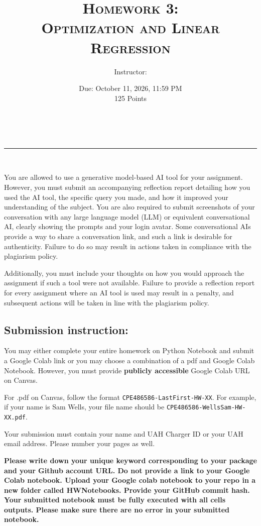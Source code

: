 \documentclass[12pt, xcolor=dvipsnames,svgnames,x11names]{article}
\makeatletter
\newcommand{\hdrrule}{{\color{hdrcoral}\rule{4.5em}{1.1pt}}}
\renewcommand{\maketitle}{%
      \begin{center}
         \begin{tcolorbox}[
               enhanced,
               colback=white,
               colframe=hdrslate,
               boxrule=0.8pt,
               arc=4pt,
               left=0pt,
               right=0pt,
               top=0pt,
               bottom=0pt,
               drop shadow={hdrslate!35!white},
         ]
               \begin{tcolorbox}[
                  enhanced,
                  colback=hdrplum,
                  colframe=hdrplum,
                  boxrule=0pt,
                  arc=4pt,
                  sharp corners=south,
                  left=2em,
                  right=2em,
                  top=1.1em,
                  bottom=1.1em,
                  borderline south={2.2pt}{0pt}{hdrcoral},
               ]
                  \centering
                  {\LARGE\color{white}\linespread{1.25}\selectfont\@title}
               \end{tcolorbox}

               \vspace{1.1em}
               \centering
               {\large\color{hdrslate}\@author}\\[0.7em]
               \hdrrule\\[0.7em]
               {\normalsize\color{hdrplum}\@date}
               \vspace{1.1em}
         \end{tcolorbox}
      \end{center}
      \vspace{1.5em}
}
\newcommand{\hw}{Homework 3:\\\normalsize Optimization and Linear Regression}
\newcommand{\duedate}{October 11, 2026, 11:59 PM}
\makeatother
\begin{document}
\title{\textsc{\hw\\
\coursenumber}}
\author{Instructor: \instructorname}
\date{Due: \duedate\\ 125 Points}

\maketitle

\setlength{\unitlength}{1in}
You are allowed to use a generative model-based AI tool for your assignment. However, you must submit an accompanying reflection report detailing how you used the AI tool, the specific query you made, and how it improved your understanding of the subject. You are also required to submit screenshots of your conversation with any large language model (LLM) or equivalent conversational AI, clearly showing the prompts and your login avatar. Some conversational AIs provide a way to share a conversation link, and such a link is desirable for authenticity. Failure to do so may result in actions taken in compliance with the plagiarism policy.

Additionally, you must include your thoughts on how you would approach the assignment if such a tool were not available. Failure to provide a reflection report for every assignment where an AI tool is used may result in a penalty, and subsequent actions will be taken in line with the plagiarism policy.

\subsection*{Submission instruction:}
You may either complete your entire homework on Python Notebook  and submit a Google Colab link or you may choose a combination of a pdf and Google Colab Notebook. However, you must provide \textbf{publicly accessible} Google Colab URL on Canvas.

For .pdf on Canvas, follow the format  \texttt{CPE486586-LastFirst-HW-XX}. For example, if your name is Sam Wells, your file name should be \texttt{CPE486586-WellsSam-HW-XX.pdf}.

Your submission must contain your name and UAH Charger ID or your UAH email address.  Please number your pages as well.

\textbf{Please write down your unique keyword corresponding to your package and your Github account URL. Do not provide a link to your Google Colab notebook. Upload your Google colab notebook to your repo in a new folder called \textbf{HWNotebooks}. Provide your GitHub commit hash. Your submitted notebook must be fully executed with all cells outputs. Please make sure there are no error in your submitted notebook.}
\end{document}
